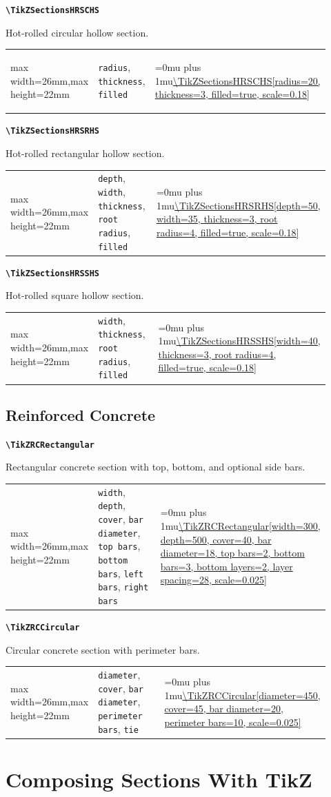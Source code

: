 \documentclass[10pt]{article}
\makeatletter
\newcommand{\command}[1]{\texttt{\textbackslash #1}}
\newcommand{\keyname}[1]{\texttt{#1}}
\newcommand{\CodeInline}[1]{%
  \begingroup
  \ttfamily\scriptsize\raggedright\Urlmuskip=0mu plus 1mu\url{#1}%
  \endgroup
}
\newcommand{\ShapePreview}[1]{%
  \begin{center}
  \begin{adjustbox}{max width=26mm,max height=22mm}
    \begin{tikzpicture}
      #1
    \end{tikzpicture}
  \end{adjustbox}
  \end{center}
}
\newcommand{\ReferenceRow}[6]{%
  \textbf{\command{#1}}\par
  #2\par
  \vspace{2pt}
  \begin{tabular}{@{}p{0.20\linewidth}p{0.34\linewidth}p{0.38\linewidth}@{}}
    #6 & \footnotesize #3 & \CodeInline{#4}
  \end{tabular}
  \par\vspace{4mm}
}
\makeatother
\begin{document}
\ReferenceRow
  {TikZSectionsHRSCHS}
  {Hot-rolled circular hollow section.}
  {\keyname{radius}, \keyname{thickness}, \keyname{filled}}
  {\TikZSectionsHRSCHS[radius=20, thickness=3, filled=true, scale=0.18]}
  {}
  {\ShapePreview{\TikZSectionsHRSCHS[radius=20, thickness=3, filled=true, scale=0.18]}}

\ReferenceRow
  {TikZSectionsHRSRHS}
  {Hot-rolled rectangular hollow section.}
  {\keyname{depth}, \keyname{width}, \keyname{thickness}, \keyname{root radius}, \keyname{filled}}
  {\TikZSectionsHRSRHS[depth=50, width=35, thickness=3, root radius=4, filled=true, scale=0.18]}
  {}
  {\ShapePreview{\TikZSectionsHRSRHS[depth=50, width=35, thickness=3, root radius=4, filled=true, scale=0.18]}}

\ReferenceRow
  {TikZSectionsHRSSHS}
  {Hot-rolled square hollow section.}
  {\keyname{width}, \keyname{thickness}, \keyname{root radius}, \keyname{filled}}
  {\TikZSectionsHRSSHS[width=40, thickness=3, root radius=4, filled=true, scale=0.18]}
  {}
  {\ShapePreview{\TikZSectionsHRSSHS[width=40, thickness=3, root radius=4, filled=true, scale=0.18]}}

\subsection{Reinforced Concrete}

\ReferenceRow
  {TikZRCRectangular}
  {Rectangular concrete section with top, bottom, and optional side bars.}
  {\keyname{width}, \keyname{depth}, \keyname{cover}, \keyname{bar diameter}, \keyname{top bars}, \keyname{bottom bars}, \keyname{left bars}, \keyname{right bars}}
  {\TikZRCRectangular[width=300, depth=500, cover=40, bar diameter=18, top bars=2, bottom bars=3, bottom layers=2, layer spacing=28, scale=0.025]}
  {}
  {\ShapePreview{\TikZRCRectangular[width=300, depth=500, cover=40, bar diameter=18, top bars=2, bottom bars=3, bottom layers=2, layer spacing=28, scale=0.025]}}

\ReferenceRow
  {TikZRCCircular}
  {Circular concrete section with perimeter bars.}
  {\keyname{diameter}, \keyname{cover}, \keyname{bar diameter}, \keyname{perimeter bars}, \keyname{tie}}
  {\TikZRCCircular[diameter=450, cover=45, bar diameter=20, perimeter bars=10, scale=0.025]}
  {}
  {\ShapePreview{\TikZRCCircular[diameter=450, cover=45, bar diameter=20, perimeter bars=10, scale=0.025]}}

\section{Composing Sections With TikZ}
\end{document}
